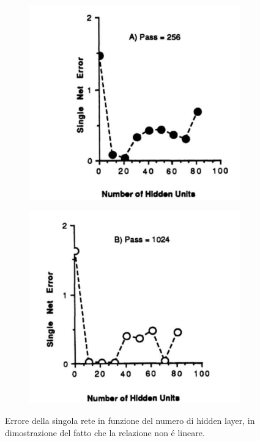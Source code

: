 \documentclass[a4paper,10pt]{article}
\begin{document}
 \begin{figure}[h!]
  \centering
  \begin{subfigure}[b]{0.4\linewidth}
   \includegraphics[width=\linewidth]{NetErrHiddenLa.png}
   \label{NetErrHiddLapgn}
  \end{subfigure}
  \begin{subfigure}[b]{0.4\linewidth}
   \includegraphics[width=\linewidth]{NetErrHiddenLb.png}
   \label{NetErrHiddLbpgn}
  \end{subfigure}
  \caption{Errore della singola rete in funzione del numero di hidden layer, in dimostrazione del fatto che la relazione non \'e lineare.}
 \end{figure}
\end{document}
